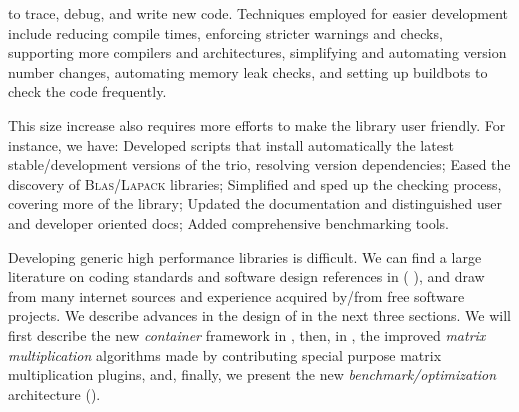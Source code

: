 to trace, debug, and write new code. Techniques employed
for easier development include reducing
compile times, enforcing stricter warnings and checks, supporting more
compilers and architectures, simplifying and automating version number
changes, automating memory leak checks, and setting up buildbots to check the code
frequently.
%
\par
%
This size increase also requires more efforts to make the library user friendly. For
instance, we have:
%
Developed %
scripts that install automatically the
latest stable/development versions of the trio, resolving version
dependencies;
%
Eased the discovery of \textsf{\textsc{Blas}}/\textsf{\textsc{Lapack}} libraries;
%
Simplified and sped up the checking process, covering more of the library;
%
Updated the documentation and distinguished user and developer oriented docs;
%
Added comprehensive benchmarking tools.
%
%
\par
%
Developing generic high performance libraries is difficult. We can find a
large literature on coding standards and software design references in (\cf{}
\cite{alexandrescu:01:modern,gamma:95:design,sutter:05:cpp,stroustrup1994design,Douglas:05:GPHP}),
and draw from many internet sources and experience acquired by/from free
software projects.
%
%
We describe advances in the design of \linbox in the next
three sections. We will first describe the new \emph{container} framework in
, then,
in ,
the improved \emph{matrix multiplication} algorithms
made by contributing special purpose matrix multiplication plugins, and, finally, we present the new \emph{benchmark/optimization}
architecture ().
%
\par
